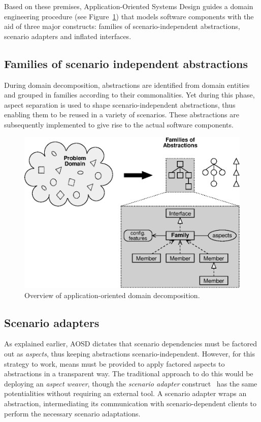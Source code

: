 \documentclass{kapproc} %
\begin{document}
 Based on these premises, Application-Oriented Systems Design guides a
 domain engineering procedure (see Figure~\ref{fig:aosd}) that models
 software components with the aid of three major constructs: families
 of scenario-independent abstractions, scenario adapters and inflated
 interfaces.

\subsection*{Families of scenario independent abstractions}

 During domain decomposition, abstractions are identified from domain
 entities and grouped in families according to their
 commonalities. Yet during this phase, aspect separation is used to
 shape scenario-independent abstractions, thus enabling them to be
 reused in a variety of scenarios.  These abstractions are
 subsequently implemented to give rise to the actual software
 components.

\begin{figure}{
\centering
\includegraphics[width=0.70\linewidth]{aosd.eps}\par}
\caption{Overview of application-oriented domain decomposition.}
\label{fig:aosd}
\end{figure}

\subsection*{Scenario adapters}

 As explained earlier, AOSD dictates that scenario dependencies must
 be factored out as \emph{aspects}, thus keeping abstractions
 scenario-independent. However, for this strategy to work, means must
 be provided to apply factored aspects to abstractions in a
 transparent way.  The traditional approach to do this would be
 deploying an \emph{aspect weaver}, though the \emph{scenario adapter}
 construct~\cite{Froehlich:sci:2000} has the same potentialities
 without requiring an external tool.  A scenario adapter wraps an
 abstraction, intermediating its communication with scenario-dependent
 clients to perform the necessary scenario adaptations.
\end{document}
